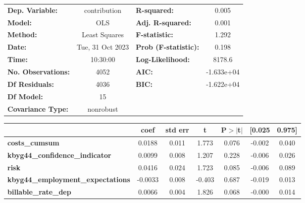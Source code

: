 \begin{center}
\begin{tabular}{lclc}
\toprule
\textbf{Dep. Variable:}                   &   contribution   & \textbf{  R-squared:         } &     0.005   \\
\textbf{Model:}                           &       OLS        & \textbf{  Adj. R-squared:    } &     0.001   \\
\textbf{Method:}                          &  Least Squares   & \textbf{  F-statistic:       } &     1.292   \\
\textbf{Date:}                            & Tue, 31 Oct 2023 & \textbf{  Prob (F-statistic):} &    0.198    \\
\textbf{Time:}                            &     10:30:00     & \textbf{  Log-Likelihood:    } &    8178.6   \\
\textbf{No. Observations:}                &        4052      & \textbf{  AIC:               } & -1.633e+04  \\
\textbf{Df Residuals:}                    &        4036      & \textbf{  BIC:               } & -1.622e+04  \\
\textbf{Df Model:}                        &          15      & \textbf{                     } &             \\
\textbf{Covariance Type:}                 &    nonrobust     & \textbf{                     } &             \\
\bottomrule
\end{tabular}
\begin{tabular}{lcccccc}
                                          & \textbf{coef} & \textbf{std err} & \textbf{t} & \textbf{P$> |$t$|$} & \textbf{[0.025} & \textbf{0.975]}  \\
\midrule
\textbf{costs\_cumsum}                    &       0.0188  &        0.011     &     1.773  &         0.076        &       -0.002    &        0.040     \\
\textbf{kbyg44\_confidence\_indicator}    &       0.0099  &        0.008     &     1.207  &         0.228        &       -0.006    &        0.026     \\
\textbf{risk}                             &       0.0416  &        0.024     &     1.723  &         0.085        &       -0.006    &        0.089     \\
\textbf{kbyg44\_employment\_expectations} &      -0.0033  &        0.008     &    -0.403  &         0.687        &       -0.019    &        0.013     \\
\textbf{billable\_rate\_dep}              &       0.0066  &        0.004     &     1.826  &         0.068        &       -0.000    &        0.014     \\

\end{tabular}
\end{center}

